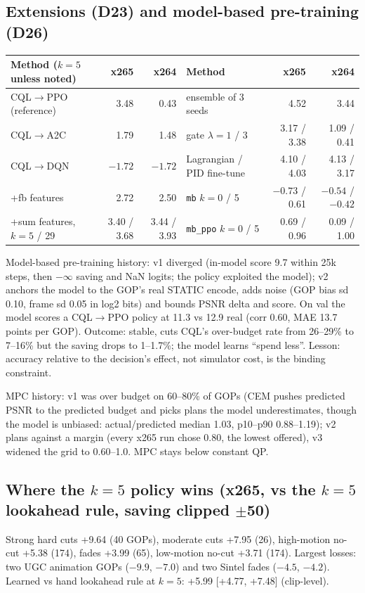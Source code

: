 \documentclass[10pt,a4paper]{article}
\newcommand{\code}[1]{\texttt{\small #1}}
\begin{document}
\subsection{Extensions (D23) and model-based pre-training (D26)}
\begin{center}\small
\begin{tabular}{lrr|lrr}
\toprule
Method ($k=5$ unless noted) & x265 & x264 & Method & x265 & x264 \\\midrule
CQL$\to$PPO (reference) & 3.48 & 0.43 & ensemble of 3 seeds & 4.52 & 3.44 \\
CQL$\to$A2C & 1.79 & 1.48 & gate $\lambda=1$ / 3 & 3.17 / 3.38 & 1.09 / 0.41 \\
CQL$\to$DQN & $-1.72$ & $-1.72$ & Lagrangian / PID fine-tune & 4.10 / 4.03 & 4.13 / 3.17 \\
+fb features & 2.72 & 2.50 & \code{mb} $k=0$ / 5 & $-0.73$ / 0.61 & $-0.54$ / $-0.42$ \\
+sum features, $k=5$ / 29 & 3.40 / 3.68 & 3.44 / 3.93 & \code{mb\_ppo} $k=0$ / 5 & 0.69 / 0.96 & 0.09 / 1.00 \\
\bottomrule
\end{tabular}
\end{center}
Model-based pre-training history: v1 diverged (in-model score 9.7 within 25k steps, then $-\infty$ saving and NaN
logits; the policy exploited the model); v2 anchors the model to the GOP's real STATIC encode, adds noise (GOP bias sd
0.10, frame sd 0.05 in log2 bits) and bounds PSNR delta and score. On val the model scores a CQL$\to$PPO policy at 11.3
vs 12.9 real (corr 0.60, MAE 13.7 points per GOP). Outcome: stable, cuts CQL's over-budget rate from 26--29\% to
7--16\% but the saving drops to 1--1.7\%; the model learns ``spend less''. Lesson: accuracy relative to the
decision's effect, not simulator cost, is the binding constraint.

MPC history: v1 was over budget on 60--80\% of GOPs (CEM pushes predicted PSNR to the predicted budget and picks plans
the model underestimates, though the model is unbiased: actual/predicted median 1.03, p10--p90 0.88--1.19); v2 plans
against a margin (every x265 run chose 0.80, the lowest offered), v3 widened the grid to 0.60--1.0. MPC stays below
constant QP.

\subsection{Where the $k=5$ policy wins (x265, vs the $k=5$ lookahead rule, saving clipped $\pm$50)}
Strong hard cuts +9.64 (40 GOPs), moderate cuts +7.95 (26), high-motion no-cut +5.38 (174), fades +3.99 (65),
low-motion no-cut +3.71 (174). Largest losses: two UGC animation GOPs ($-9.9$, $-7.0$) and two Sintel fades
($-4.5$, $-4.2$). Learned vs hand lookahead rule at $k=5$: +5.99 [+4.77, +7.48] (clip-level).
\end{document}
